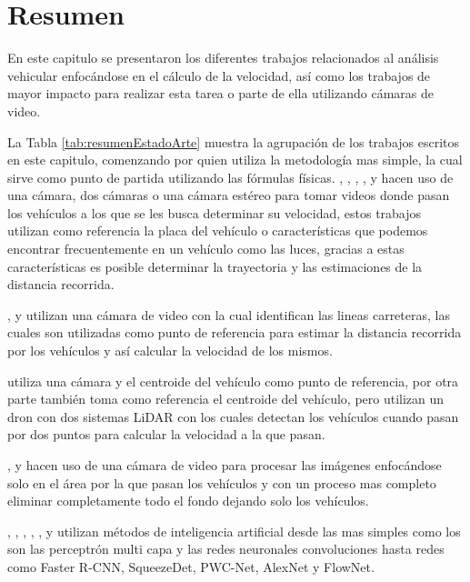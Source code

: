 \section{Resumen}

En este capitulo se presentaron los diferentes trabajos relacionados al análisis vehicular enfocándose en el cálculo de la velocidad, así como los trabajos de mayor impacto para realizar esta tarea o parte de ella utilizando cámaras de video.

La Tabla \ref{tab:resumenEstadoArte} muestra la agrupación de los trabajos escritos en este capitulo, comenzando por 
\citeauthor{singh2007Estimating} quien utiliza la metodología mas simple, la cual sirve como punto de partida utilizando las fórmulas físicas. 
\citeauthor{llorca2016Two},
\citeauthor{yang2019Vehicle},
\citeauthor{yang2021Robust},
\citeauthor{yang2021Improved},
\citeauthor{luvizon2014Vehicle} y
\citeauthor{vakili2020Single}
hacen uso de una cámara, dos cámaras o una cámara estéreo para tomar videos donde pasan los vehículos a los que se les busca determinar su velocidad, estos trabajos utilizan como referencia la placa del vehículo o características que podemos encontrar frecuentemente en un vehículo como las luces, gracias a estas características es posible determinar la trayectoria y las estimaciones de la distancia recorrida.

\citeauthor{bevilacqua2016Egomotion},
\citeauthor{schoepflin2003Dynamic} y 
\citeauthor{anil2015Real} utilizan una cámara de video con la cual identifican las lineas carreteras, las cuales son utilizadas como punto de referencia para estimar la distancia recorrida por los vehículos y así calcular la velocidad de los mismos.

\citeauthor{kamoji2020Image} utiliza una cámara y el centroide del vehículo como punto de referencia, por otra parte \citeauthor{lee2021Study} también toma como referencia el centroide del vehículo, pero utilizan un dron con dos sistemas LiDAR con los cuales detectan los vehículos cuando pasan por dos puntos para calcular la velocidad a la que pasan.

\citeauthor{li2014Video},
\citeauthor{kurniawan2018Speed} y 
\citeauthor{jalalat2016Vehicle}
hacen uso de una cámara de video para procesar las imágenes enfocándose solo en el área por la que pasan los vehículos y con un proceso mas completo eliminar completamente todo el fondo dejando solo los vehículos.

\citeauthor{bell2020Accurate},
\citeauthor{dong2019Vehicle},
\citeauthor{burnett2020aUToTrack},
\citeauthor{kampelmuhler2018Camera},
\citeauthor{song2020Learning},
\citeauthor{zhang2017Vehicle} y 
\citeauthor{loor2017Visual}
utilizan métodos de inteligencia artificial desde las mas simples como los son las perceptrón multi capa y las redes neuronales convoluciones hasta redes como Faster R-CNN, SqueezeDet, PWC-Net, AlexNet y FlowNet.


